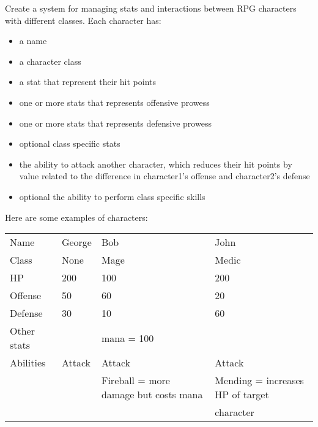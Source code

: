 Create a system for managing stats and interactions between RPG characters with different classes.
Each character has:
\begin{itemize}
\item a name
\item a character class
\item a stat that represent their hit points
\item one or more stats that represents offensive prowess
\item one or more stats that represents defensive prowess
\item optional class specific stats
\item the ability to attack another character, which reduces their hit points by value related to the difference in character1's offense and character2's defense
\item optional the ability to perform class specific skills
\end{itemize}

Here are some examples of characters:
\begin{table}[h]
\centering
\label{my-label}
\begin{tabular}{llll}
Name        & George & Bob                                   & John                                      \\
Class       & None   & Mage                                  & Medic                                     \\
HP          & 200    & 100                                   & 200                                       \\
Offense     & 50     & 60                                    & 20                                        \\
Defense     & 30     & 10                                    & 60                                        \\
Other stats &        & mana = 100                            &                                           \\
Abilities   & Attack & Attack                                & Attack                                    \\
            &        & Fireball = more damage but costs mana & Mending = increases HP of target          \\
            &        &                                       & character
\end{tabular}
\end{table}

